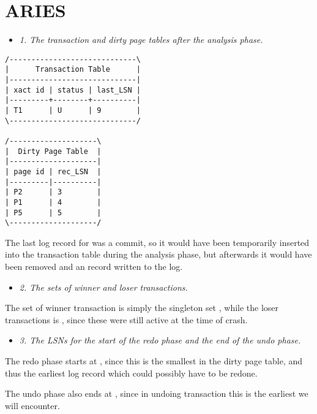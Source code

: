 \newpage
\section{ARIES}

\begin{itemize}
  \item \textit{1. The transaction and dirty page tables after the analysis
    phase.}
\end{itemize}


\begin{verbatim}
/-----------------------------\
|      Transaction Table      |
|-----------------------------|
| xact id | status | last_LSN |
|---------+--------+----------|
| T1      | U      | 9        |
\-----------------------------/

/--------------------\
|  Dirty Page Table  |
|--------------------|
| page id | rec_LSN  |
|---------|----------|
| P2      | 3        |
| P1      | 4        |
| P5      | 5        |
\--------------------/
\end{verbatim}

The last log record for  was a commit, so it would have been temporarily
inserted into the transaction table during the analysis phase, but afterwards it
would have been removed and an \ms{end} record written to the log.
\streg

\begin{itemize}
  \item \textit{2. The sets of winner and loser transactions.}
\end{itemize}

The set of winner transaction is simply the singleton set , while the
loser transactions is , since these were still active at the time
of crash.

\streg

\begin{itemize}
  \item \textit{3. The LSNs for the start of the redo phase and the end of the
    undo phase.}
\end{itemize}

The redo phase starts at , since this is the smallest  in
the dirty page table, and thus the earliest log record which could possibly have
to be redone.
\smallskip

The undo phase also ends at , since in undoing transaction 
this is the earliest  we will encounter.

